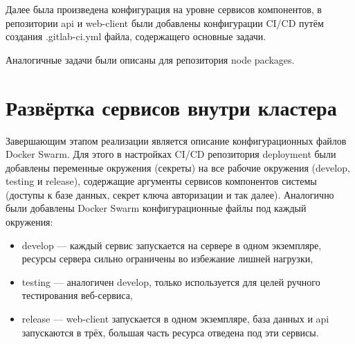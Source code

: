 Далее была произведена конфигурация на уровне сервисов компонентов, в репозитории api и web-client были добавлены конфигурации CI/CD путём создания .gitlab-ci.yml файла, содержащего основные задачи.

Аналогичные задачи были описаны для репозитория node packages.

\section{Развёртка сервисов внутри кластера}

Завершающим этапом реализации является описание конфигурационных файлов Docker Swarm.
Для этого в настройках CI/CD репозитория deployment были добавлены переменные окружения (секреты) на все рабочие окружения (develop, testing и release),
содержащие аргументы сервисов компонентов системы (доступы к базе данных, секрет ключа авторизации и так далее)\cite{kuberForDevOps}.
Аналогично были добавлены Docker Swarm конфигурационные файлы под каждый окружения:

\begin{itemize}
    \item develop --- каждый сервис запускается на сервере в одном экземпляре, ресурсы сервера сильно ограничены во избежание лишней нагрузки,
    \item testing --- аналогичен develop, только используется для целей ручного тестирования веб-сервиса,
    \item release --- web-client запускается в одном экземпляре, база данных и api запускаются в трёх, большая часть ресурса отведена под эти сервисы.
\end{itemize}

